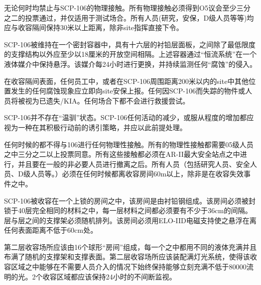 



无论何时均禁止与SCP-106的物理接触。所有物理接触必须得到O5议会至少三分之二的投票通过，并仅适用于测试场合。所有人员(研究，安保，D级人员等等)均应与收容隔间保持30米以上距离，除非site指挥直接下令。

SCP-106被维持在一个密封容器中，具有十六层的衬铅层面板，之间除了最低限度的支撑结构以外应至少以18厘米的开放空间相隔。上述容器通过“恒流系统”在一个液体媒介中保持悬浮。该媒介每24小时进行更换，并持续监测任何“腐蚀”的侵入。

在收容隔间表面，任何员工中，或者在SCP-106周围距离200米以内的site中其他位置发生的任何腐蚀现象应立即向site安保上报。任何因SCP-106而失踪的物件或人员将被视为已遗失\slash KIA。任何场合下都不会进行救援尝试。

SCP-106并不存在“温驯”状态。SCP-106任何活动的减少，或服从程度的增加都应视为一种在其积极行动前的诱引策略，并应以此前提处理。




任何时候的都不得与106进行任何物理性接触。所有的物理性接触都需要05级人员之中三分之二以上投票同意。所有这些接触都必须在AR-II最大安全站点之中进行，并且要在一般的非必要人员进行撤离之后。所有人员（包括研究人员、安全人员、D级人员等。）必须在任何时候都离收容房间60m以上，除非是在收容失效事件之中。

SCP-106被收容在一个上锁的房间之中，该房间是由衬铅钢组成。该房间必须被封锁于40层完全相同的材料之中，每一层材料之间都必须要有不少于36cm的间隔。层与层之间的支撑架必须随机排列。该房间必须用ELO-IID电磁支持使之悬浮在离任何表面距离不低于60cm处。

第二层收容场所应该由16个球形“房间”组成，每一个之中都用不同的液体充满并且布满了随机的支撑架和支撑表面。第二层收容场所应该装配满灯光系统，使得该收容区域之中能够在不需要人员介入的情况下始终保持能够立刻充满不低于80000流明的光。2个收容区域都应该保持24小时的不间断监视。

